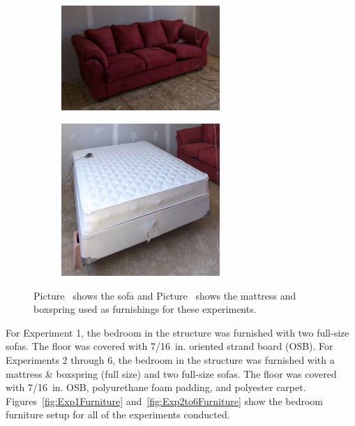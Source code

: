 \documentclass[12pt,oneside]{book}
\begin{document}
\begin{figure}[ht]
  \centering
  \begin{subfigure}[Sofa]{0.5\linewidth}
    \centering\includegraphics[width=6cm]{Figures/Furniture/sofa.jpg}
    \caption{\label{fig:Sofa}}
  \end{subfigure}%
  \begin{subfigure}[Bed]{0.5\linewidth}
    \centering\includegraphics[width=6cm]{Figures/Furniture/bed.jpg}
    \caption{\label{fig:Bed}}
  \end{subfigure}
  \caption{Picture~ shows the sofa and Picture~ shows the mattress and boxspring used as furnishings for these experiments.}
  \label{fig:FurnitureImages}
\end{figure}

For Experiment 1, the bedroom in the structure was furnished with two full-size sofas. The floor was covered with 7/16~in. oriented strand board (OSB). For Experiments 2 through 6, the bedroom in the structure was furnished with a mattress \& boxspring (full size) and two full-size sofas. The floor was covered with 7/16~in. OSB, polyurethane foam padding, and polyester carpet. Figures~\ref{fig:Exp1Furniture} and~\ref{fig:Exp2to6Furniture} show the bedroom furniture setup for all of the experiments conducted.
\end{document}
